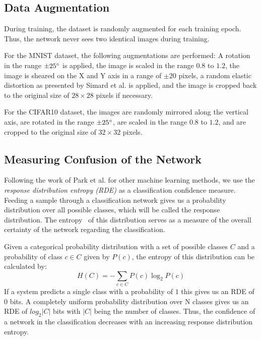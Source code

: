 \documentclass[10pt,twocolumn,letterpaper]{article}
\begin{document}
\subsection{Data Augmentation}
\label{sec-2-2}
During training, the dataset is randomly augmented for each training
epoch. Thus, the network never sees two identical images during
training.

For the MNIST dataset, the following augmentations are performed: A
rotation in the range $\pm 25 \degree$ is applied, the image is scaled
in the range $0.8$ to $1.2$, the image is sheared on the X and Y axis
in a range of $\pm 20$ pixels, a random elastic distortion as
presented by Simard et al. \cite{simard2003best} is applied, and the
image is cropped back to the original size of $28 \times 28$ pixels if
necessary.

For the CIFAR10 dataset, the images are randomly mirrored along the
vertical axis, are rotated in the range $\pm 25 \degree$, are scaled
in the range $0.8$ to $1.2$, and are cropped to the original size of
$32 \times 32$ pixels.
\subsection{Measuring Confusion of the Network}
\label{sec:conf}
Following the work of Park et al. \cite{park2015using} for other
machine learning methods, we use the \emph{response distribution
  entropy (RDE)} as a classification confidence measure. Feeding a
sample through a classification network gives us a probability
distribution over all possible classes, which will be called the
response distribution. The entropy~\cite{shannon2001mathematical} of
this distribution serves as a measure of the overall certainty of the
network regarding the classification.

Given a categorical probability distribution with a set of possible
classes $C$ and a probability of class $c \in C$ given by $P(c)$, the
entropy of this distribution can be calculated by:
\begin{equation}
  \label{eq:1}
  H(C) = -\sum_{c \in C} P(c) \log_2 P(c)
\end{equation}
If a system predicts a single class with a probability of $1$ this
gives us an RDE of $0$ bits. A completely uniform probability
distribution over N classes gives us an RDE of $log_2 |C|$ bits with
$|C|$ being the number of classes. Thus, the confidence of a network
in the classification decreases with an increasing response
distribution entropy.
\end{document}

